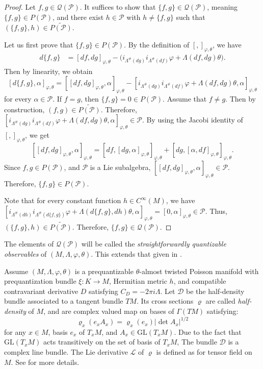 \documentclass[a4paper,10pt]{article}
\numberwithin{equation}{section}
\theoremstyle{plain}
\begin{document}
	\begin{proof}
		Let $f,g \in \mathcal{Q}(\mathcal{P})$. It suffices to  show that $\{f,g\} \in \mathcal{Q}(\mathcal{P})$, meaning
		$\{f,g\} \in P(\mathcal{P})$, and there exist $h \in \mathcal{P}$ with  $h\neq\{f,g\}$ such that  $(\{f,g\},h) \in \widetilde{P(\mathcal{P})}$.
		
		Let us first prove  that  $\{f,g\} \in P(\mathcal{P})$.
		By the  definition of $[ , ]_{\varphi,\theta}$, we have
		\begin{align}\label{na4}
		d\{f,g\}&= [df,dg]_{\varphi,\theta} - \Big(i_{\Lambda^\#(dg)}i_{\Lambda^\#(df)}\varphi+\Lambda(df,dg)\theta\Big).
		\end{align}
		Then by linearity, we obtain  $$[d\{f,g\},\alpha]_{\varphi,\theta}= [[df,dg]_{\varphi,\theta},\alpha]_{\varphi,\theta}-[ i_{\Lambda^\#(dg)}i_{\Lambda^\#(df)}\varphi+\Lambda(df,dg)\theta, \alpha]_{\varphi,\theta}$$ for every $\alpha\in\mathcal{P}$. If $f=g$, then $\{f,g\}=0\in P(\mathcal{P})$.  Assume that $f\neq g$. Then  by construction, $(f,g)\in \widetilde{P(\mathcal{P})}$. Therefore, $[ i_{\Lambda^\#(dg)}i_{\Lambda^\#(df)}\varphi+\Lambda(df,dg)\theta, \alpha]_{\varphi,\theta}\in \mathcal{P}$. By using the Jacobi identity of $[ , ]_{\varphi,\theta}$, we get
		\[
		[[df,dg]_{\varphi,\theta}, \alpha]_{\varphi,\theta} = [df, [dg,\alpha]_{\varphi,\theta}]_{\varphi,\theta} + [dg, [\alpha,df]_{\varphi,\theta}]_{\varphi,\theta}.
		\]
		Since $f,g \in P(\mathcal{P})$, and  $\mathcal{P}$ is a Lie subalgebra, $[[df,dg]_{\varphi,\theta}, \alpha]_{\varphi,\theta}\in \mathcal{P}$. Therefore, $\{f,g\} \in P(\mathcal{P})$.
		\par
		Note that for every constant function $h\in C^\infty(M)$, we  have
		$[ i_{\Lambda^\#(dh)}i_{\Lambda^\#(d\{f,g\})}\varphi+\Lambda(d\{f,g\},dh)\theta, \alpha]_{\varphi,\theta}=[0,\alpha]_{\varphi,\theta}\in \mathcal{P}$.
		Thus, $(\{f,g\},h) \in \widetilde{P(\mathcal{P})}$. Therefore, $\{f,g\} \in \mathcal{Q}(\mathcal{P})$.
	\end{proof}
	The elements of $\mathcal{Q}(\mathcal{P})$  will be called the \emph{straightforwardly quantizable observables} of $(M,\Lambda,\varphi,\theta)$. This extends that given in \cite{R2}.
	
	Assume  $(M,\Lambda,\varphi,\theta)$ is  a  prequantizable  $\theta$-almost twisted Poisson manifold  with prequantization bundle $\xi:K \to M$, Hermitian metric $h$, and compatible contravariant derivative $D$ satisfying $C_D = -2\pi i \Lambda$.
	Let $\mathcal{D}$ be the  half-density bundle  associated to  a tangent bundle $TM$. Its cross sections  $\varrho$  are  called  \emph{half-density} of $M$, and   are  complex valued map on bases of $\Gamma(TM)$ satisfying:
	\[
	\varrho_x(e_xA_x) = \varrho_x(e_x)|\det A_x|^{1/2}
	\]
	for any $x \in M$, basis $e_x$ of $T_xM$, and $A_x \in \mathrm{GL}(T_xM)$.  Due to the fact that $\mathrm{GL}(T_xM)$ acts transitively on the set of basis of $T_xM$,  The bundle $\mathcal{D}$ is a complex line bundle. The Lie derivative $\mathcal{L}$ of $\varrho$ is defined as for tensor field on $M$. See \cite{R24,R25} for more details.
	
\end{document}
